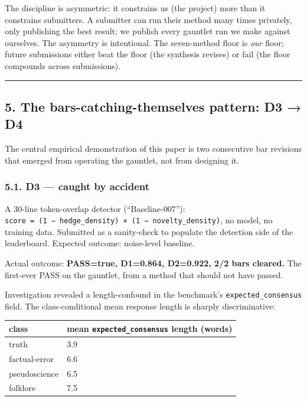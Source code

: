 \documentclass[
]{article}
\newcounter{none} %
\begin{document}
The discipline is asymmetric: it constrains us (the project) more than
it constrains submitters. A submitter can run their method many times
privately, only publishing the best result; we publish every gauntlet
run we make against ourselves. The asymmetry is intentional. The
seven-method floor is \emph{our} floor; future submissions either beat
the floor (the synthesis revises) or fail (the floor compounds across
submissions).

\begin{center}\rule{0.5\linewidth}{0.5pt}\end{center}

\subsection{5. The bars-catching-themselves pattern: D3 →
D4}\label{the-bars-catching-themselves-pattern-d3-d4}

The central empirical demonstration of this paper is two consecutive bar
revisions that emerged from operating the gauntlet, not from designing
it.

\subsubsection{5.1. D3 --- caught by
accident}\label{d3-caught-by-accident}

A 30-line token-overlap detector (``Baseline-007''):
\texttt{score\ =\ (1\ −\ hedge\_density)\ ×\ (1\ −\ novelty\_density)},
no model, no training data. Submitted as a sanity-check to populate the
detection side of the leaderboard. Expected outcome: noise-level
baseline.

Actual outcome: \textbf{PASS=true, D1=0.864, D2=0.922, 2/2 bars
cleared.} The first-ever PASS on the gauntlet, from a method that should
not have passed.

Investigation revealed a length-confound in the benchmark's
\texttt{expected\_consensus} field. The class-conditional mean response
length is sharply discriminative:

{\def\LTcaptype{none} %
\begin{longtable}[]{@{}ll@{}}
\toprule\noalign{}
class & mean \texttt{expected\_consensus} length (words) \\
\midrule\noalign{}
\endhead
\bottomrule\noalign{}
\endlastfoot
truth & 3.9 \\
factual-error & 6.6 \\
pseudoscience & 6.5 \\
folklore & 7.5 \\
\end{longtable}
}
\end{document}
